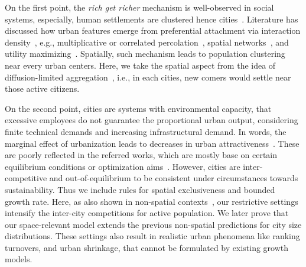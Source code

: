 \documentclass[reprint,unsortedaddress,amsmath,amssymb,aps,prl,showkeys]{revtex4-2}
\begin{document}
On the first point, the \textit{rich get richer} mechanism is well-observed in social systems, especially, human settlements are clustered hence cities~\cite{marsili1998interacting}. Literature has discussed how urban features emerge from preferential attachment via interaction density~\cite{ccolak2016understanding,louf2014congestion,fujita1976spatial}, e.g., multiplicative or correlated percolation~\cite{makse1995modelling,PhysRevE.58.7054,rybski2013distance}, spatial networks~\cite{marsili1998interacting,court2013origins,Li2017Simple}, and utility maximizing~\cite{PhysRevE.90.042815,axtell2001emergent}. Spatially, such mechanism leads to population clustering near every urban centers. Here, we take the spatial aspect from the idea of diffusion-limited aggregation~\cite{makse1995modelling, rybski2013distance, kleinberg2000navigation}, i.e., in each cities, new comers would settle near those active citizens.

On the second point, cities are systems with environmental capacity, that excessive employees do not guarantee the proportional urban output, considering finite technical demands and increasing infrastructural demand. In words, the marginal effect of urbanization leads to decreases in urban attractiveness~\cite{atkinson2012urban, girardin2009quantifying,gomez2018explaining,parris2003characterizing,batty2008size}. These are poorly reflected in the referred works, which are mostly base on certain equilibrium conditions or optimization aims~\cite{zipf1949human}. However, cities are inter-competitive and out-of-equilibrium to be consistent under circumstances towards sustainability\cite{fujita1976spatial,louf2014congestion,ccolak2016understanding}. Thus we include rules for spatial exclusiveness and bounded growth rate. Here, as also shown in non-spatial contexts~\cite{PhysRevE.55.R3817}, our restrictive settings intensify the inter-city competitions for active population\cite{batty2017urban}. We later prove that our space-relevant model extends the previous non-spatial predictions for city size distributions. These settings also result in realistic urban phenomena like ranking turnovers\cite{gabaix2004evolution}, and urban shrinkage\cite{haase2014conceptualizing}, that cannot be formulated by existing growth models.
\end{document}

